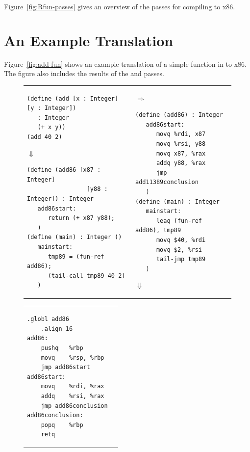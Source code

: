 \documentclass[11pt]{book}
\begin{document}
Figure~\ref{fig:Rfun-passes} gives an overview of the passes for
compiling \LangFun{} to x86.

\section{An Example Translation}
\label{sec:functions-example}

Figure~\ref{fig:add-fun} shows an example translation of a simple
function in \LangFun{} to x86. The figure also includes the results of the
 and  passes.

\begin{figure}[htbp]
\begin{tabular}{ll}
\begin{minipage}{0.5\textwidth}
\begin{lstlisting}[basicstyle=\ttfamily\scriptsize]
(define (add [x : Integer] [y : Integer])
   : Integer
   (+ x y))
(add 40 2)
\end{lstlisting}
$\Downarrow$
\begin{lstlisting}[basicstyle=\ttfamily\scriptsize]
(define (add86 [x87 : Integer]
                 [y88 : Integer]) : Integer
   add86start:
      return (+ x87 y88);
   )
(define (main) : Integer ()
   mainstart:
      tmp89 = (fun-ref add86);
      (tail-call tmp89 40 2)
   )
\end{lstlisting}
\end{minipage}
&
$\Rightarrow$
\begin{minipage}{0.5\textwidth}
\begin{lstlisting}[basicstyle=\ttfamily\scriptsize]
(define (add86) : Integer
   add86start:
      movq %rdi, x87
      movq %rsi, y88
      movq x87, %rax
      addq y88, %rax
      jmp add11389conclusion
   )
(define (main) : Integer
   mainstart:
      leaq (fun-ref add86), tmp89
      movq $40, %rdi
      movq $2, %rsi
      tail-jmp tmp89
   )
\end{lstlisting}
$\Downarrow$
\end{minipage}
\end{tabular}
\begin{tabular}{ll}
\begin{minipage}{0.3\textwidth}
\begin{lstlisting}[basicstyle=\ttfamily\scriptsize]
	.globl add86
	.align 16
add86:
	pushq	%rbp
	movq	%rsp, %rbp
	jmp	add86start
add86start:
	movq	%rdi, %rax
	addq	%rsi, %rax
	jmp add86conclusion
add86conclusion:
	popq	%rbp
	retq
\end{lstlisting}

\end{minipage}
\end{tabular}
\end{figure}
\end{document}
